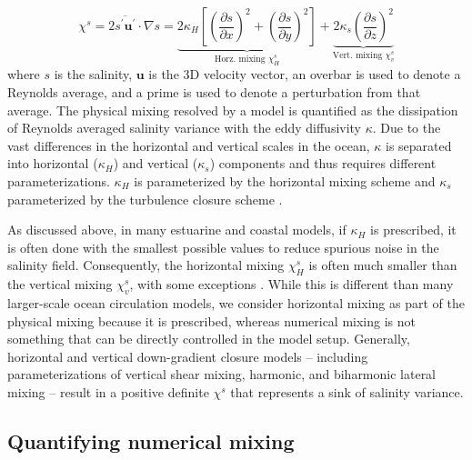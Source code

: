 \begin{equation} \label{eq:chi_whole}
    \chi^s = 2 \overline{s^\prime \mathbf{u}^\prime} \cdot \nabla s = \underbrace{2\kappa_H \left[\left(\frac{\partial s}{\partial x}\right)^2 + \left(\frac{\partial s}{\partial y} \right)^2 \right]}_{\text{Horz. mixing $\chi_H^s$}}+\underbrace{2 \kappa_s \left(\frac{\partial s}{\partial z} \right)^2}_{\text{Vert. mixing $\chi_v^s$}}
\end{equation}
where $s$ is the salinity, $\mathbf{u}$ is the 3D velocity vector, an overbar is used to denote a Reynolds average, and a prime is used to denote a perturbation from that average. The physical mixing resolved by a model is quantified as the dissipation of Reynolds averaged salinity variance with the eddy diffusivity $\kappa$. Due to the vast differences in the horizontal and vertical scales in the ocean, $\kappa$ is separated into horizontal ($\kappa_H$) and vertical ($\kappa_s$) components and thus requires different parameterizations. $\kappa_H$ is parameterized by the horizontal mixing scheme and $\kappa_s$ parameterized by the turbulence closure scheme \citep{Burchard_2008, MacCready_2018}. 

As discussed above, in many estuarine and coastal models, if $\kappa_H$ is prescribed, it is often done with the smallest possible values to reduce spurious noise in the salinity field. Consequently, the horizontal mixing $\chi_H^s$ is often much smaller \citep{geyer2014estuarine} than the vertical mixing $\chi_v^s$, with some exceptions \citep{Broatch_2022}. While this is different than many larger-scale ocean circulation models, we consider horizontal mixing as part of the physical mixing because it is prescribed, whereas numerical mixing is not something that can be directly controlled in the model setup. Generally, horizontal and vertical down-gradient closure models -- including parameterizations of vertical shear mixing, harmonic, and biharmonic lateral mixing -- result in a positive definite $\chi^s$ that represents a sink of salinity variance.

\subsection{Quantifying numerical mixing}

